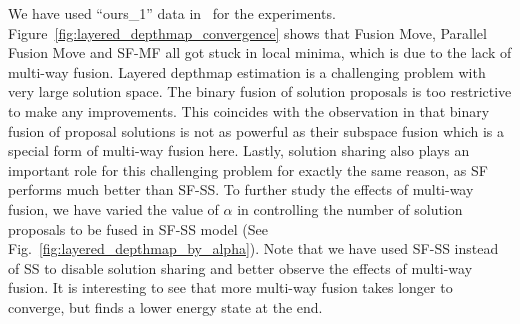 
\noindent We have used ``ours\_1'' data in~\cite{layered_depthmap} for
the experiments. Figure~\ref{fig:layered_depthmap_convergence} shows
that Fusion Move, Parallel Fusion Move and SF-MF all got stuck in local
minima, which is due to the lack of multi-way fusion.  Layered depthmap
estimation is a challenging problem with very large solution space. The
binary fusion of solution proposals is too restrictive to make any
improvements.  This coincides with the observation in
\cite{layered_depthmap} that binary fusion of proposal solutions is not
as powerful as their subspace fusion which is a special form of
multi-way fusion here. Lastly, solution sharing also plays an important
role for this challenging problem for exactly the same reason, as SF
performs much better than SF-SS.
%
To further study the effects of multi-way fusion, we have varied the
value of $\alpha$ in controlling the number of solution proposals to be
fused in SF-SS model (See
Fig.~\ref{fig:layered_depthmap_by_alpha}). Note that we have used SF-SS
instead of SS to disable solution sharing and better observe the effects
of multi-way fusion.
It is interesting to see that more multi-way fusion takes longer to
converge, but finds a lower energy state at the end.

